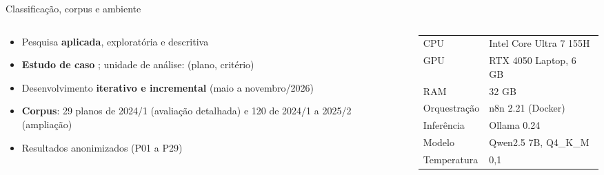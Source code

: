 \documentclass[aspectratio=169,11pt,xcolor=table]{beamer}
\begin{document}
\begin{frame}{Classificação, corpus e ambiente}
  \begin{columns}[T]
    \begin{column}{0.48\textwidth}
      \begin{itemize}\setlength\itemsep{0.55em}
        \item Pesquisa \textbf{aplicada}, exploratória e descritiva \cite{Gil2017}
        \item \textbf{Estudo de caso} \cite{Yin2015}; unidade de análise:
              (plano, critério)
        \item Desenvolvimento \textbf{iterativo e incremental} (maio a novembro/2026)
        \item \textbf{Corpus}: 29 planos de 2024/1 (avaliação detalhada) e 120 de 2024/1 a 2025/2 (ampliação)
        \item Resultados anonimizados (P01 a P29)
      \end{itemize}
    \end{column}
    \begin{column}{0.46\textwidth}
      \begin{cartao}[title={Ambiente experimental}]
        \footnotesize
        \begin{tabular}{@{}ll@{}}
          CPU & Intel Core Ultra 7 155H \\
          GPU & RTX 4050 Laptop, 6 GB \\
          RAM & 32 GB \\
          Orquestração & n8n 2.21 (Docker) \\
          Inferência & Ollama 0.24 \\
          Modelo & Qwen2.5 7B, Q4\_K\_M \\
          Temperatura & 0,1 \\
        \end{tabular}
      \end{cartao}
    \end{column}
  \end{columns}
\end{frame}
\end{document}
